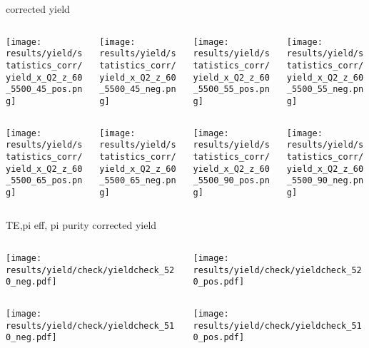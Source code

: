\begin{frame}{corrected yield}
\begin{columns}
\begin{column}[T]{0.25\textwidth}
\texttt{[image: results/yield/statistics\_corr/yield\_x\_Q2\_z\_60\_5500\_45\_pos.png]}
\end{column}
\begin{column}[T]{0.25\textwidth}
\texttt{[image: results/yield/statistics\_corr/yield\_x\_Q2\_z\_60\_5500\_45\_neg.png]}
\end{column}
\begin{column}[T]{0.25\textwidth}
\texttt{[image: results/yield/statistics\_corr/yield\_x\_Q2\_z\_60\_5500\_55\_pos.png]}
\end{column}
\begin{column}[T]{0.25\textwidth}
\texttt{[image: results/yield/statistics\_corr/yield\_x\_Q2\_z\_60\_5500\_55\_neg.png]}
\end{column}
\end{columns}
\begin{columns}
\begin{column}[T]{0.25\textwidth}
\texttt{[image: results/yield/statistics\_corr/yield\_x\_Q2\_z\_60\_5500\_65\_pos.png]}
\end{column}
\begin{column}[T]{0.25\textwidth}
\texttt{[image: results/yield/statistics\_corr/yield\_x\_Q2\_z\_60\_5500\_65\_neg.png]}
\end{column}
\begin{column}[T]{0.25\textwidth}
\texttt{[image: results/yield/statistics\_corr/yield\_x\_Q2\_z\_60\_5500\_90\_pos.png]}
\end{column}
\begin{column}[T]{0.25\textwidth}
\texttt{[image: results/yield/statistics\_corr/yield\_x\_Q2\_z\_60\_5500\_90\_neg.png]}
\end{column}
\end{columns}
\end{frame}
\begin{frame}{TE,pi eff, pi purity corrected yield}
\begin{columns}
\begin{column}[T]{0.5\textwidth}
\texttt{[image: results/yield/check/yieldcheck\_520\_neg.pdf]}
\end{column}
\begin{column}[T]{0.5\textwidth}
\texttt{[image: results/yield/check/yieldcheck\_520\_pos.pdf]}
\end{column}
\end{columns}
\begin{columns}
\begin{column}[T]{0.5\textwidth}
\texttt{[image: results/yield/check/yieldcheck\_510\_neg.pdf]}
\end{column}
\begin{column}[T]{0.5\textwidth}
\texttt{[image: results/yield/check/yieldcheck\_510\_pos.pdf]}
\end{column}
\end{columns}
\end{frame}
